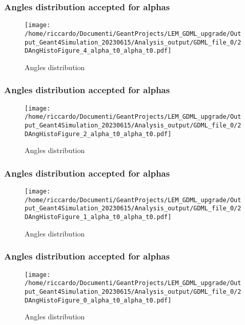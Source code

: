 \documentclass[8pt]{beamer}
\begin{document}
        \begin{frame}
            \frametitle{Angles distribution accepted for alphas}
        
        \begin{figure}[h]
            \centering
            \texttt{[image: /home/riccardo/Documenti/GeantProjects/LEM\_GDML\_upgrade/Output\_Geant4Simulation\_20230615/Analysis\_output/GDML\_file\_0/2DAngHistoFigure\_4\_alpha\_t0\_alpha\_t0.pdf]}
            \caption{Angles distribution}
        \end{figure}
        
        \end{frame}
        
        \begin{frame}
            \frametitle{Angles distribution accepted for alphas}
        
        \begin{figure}[h]
            \centering
            \texttt{[image: /home/riccardo/Documenti/GeantProjects/LEM\_GDML\_upgrade/Output\_Geant4Simulation\_20230615/Analysis\_output/GDML\_file\_0/2DAngHistoFigure\_2\_alpha\_t0\_alpha\_t0.pdf]}
            \caption{Angles distribution}
        \end{figure}
        
        \end{frame}
        
        \begin{frame}
            \frametitle{Angles distribution accepted for alphas}
        
        \begin{figure}[h]
            \centering
            \texttt{[image: /home/riccardo/Documenti/GeantProjects/LEM\_GDML\_upgrade/Output\_Geant4Simulation\_20230615/Analysis\_output/GDML\_file\_0/2DAngHistoFigure\_1\_alpha\_t0\_alpha\_t0.pdf]}
            \caption{Angles distribution}
        \end{figure}
        
        \end{frame}
        
        \begin{frame}
            \frametitle{Angles distribution accepted for alphas}
        
        \begin{figure}[h]
            \centering
            \texttt{[image: /home/riccardo/Documenti/GeantProjects/LEM\_GDML\_upgrade/Output\_Geant4Simulation\_20230615/Analysis\_output/GDML\_file\_0/2DAngHistoFigure\_0\_alpha\_t0\_alpha\_t0.pdf]}
            \caption{Angles distribution}
        \end{figure}
        
        \end{frame}
        
\end{document}
